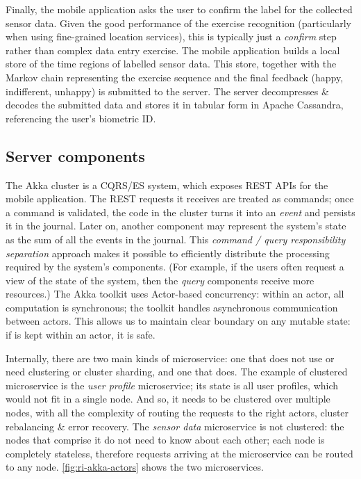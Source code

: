 \documentclass[a4paper, 10 pt, conference]{IEEEtran}
\begin{document}
Finally, the mobile application asks the user to confirm the label for the collected sensor data. Given the good performance of the exercise recognition (particularly when using fine-grained location services), this is typically just a \emph{confirm} step rather than complex data entry exercise. The mobile application builds a local store of the time regions of labelled sensor data. This store, together with the Markov chain representing the exercise sequence and the final feedback (happy, indifferent, unhappy) is submitted to the server. The server decompresses \& decodes the submitted data and stores it in tabular form in Apache Cassandra, referencing the user's biometric ID. 

\subsection{Server components}

The Akka cluster is a CQRS/ES system, which exposes REST APIs for the mobile application. The REST requests it receives are treated as commands; once a command is validated, the code in the cluster turns it into an \emph{event} and persists it in the journal. Later on, another component may represent the system's state as the sum of all the events in the journal. This \emph{command / query responsibility separation} approach makes it possible to efficiently distribute the processing required by the system's components. (For example, if the users often request a view of the state of the system, then the \emph{query} components receive more resources.) The Akka toolkit uses Actor-based concurrency: within an actor, all computation is synchronous; the toolkit handles asynchronous communication between actors. This allows us to maintain clear boundary on any mutable state: if is kept within an actor, it is safe. 

Internally, there are two main kinds of microservice: one that does not use or need clustering or cluster sharding, and one that does. The example of clustered microservice is the \emph{user profile} microservice; its state is all user profiles, which would not fit in a single node. And so, it needs to be clustered over multiple nodes, with all the complexity of routing the requests to the right actors, cluster rebalancing \& error recovery. The \emph{sensor data} microservice is not clustered: the nodes that comprise it do not need to know about each other; each node is completely stateless, therefore requests arriving at the microservice can be routed to any node. \autoref{fig:ri-akka-actors} shows the two microservices.
\end{document}
